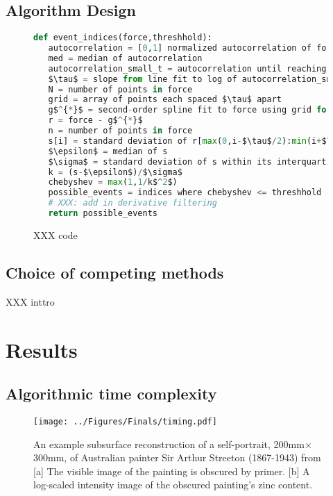 \documentclass[%
  aip,12pt,tightenlines,
  amsthm,
 amsmath,amssymb
]{article}
\newcommand{\fLabel}[1]{\label{figure:#1}}
\newcommand{\sLabel}[1]{\label{section:#1}}
\newcommand{\pcaption}[1]{\caption{\noindent#1}}
\newcommand{\pEndF}[0]{ \\ }
\newcommand{\pStartF}[0]{ }
\begin{document}
\subsection{\sLabel{Algorithm}Algorithm Design}


\begin{figure}
  \begin{lstlisting}[language=Python]
def event_indices(force,threshhold):
   autocorrelation = [0,1] normalized autocorrelation of force
   med = median of autocorrelation
   autocorrelation_small_t = autocorrelation until reaching med
   $\tau$ = slope from line fit to log of autocorrelation_small_t
   N = number of points in force
   grid = array of points each spaced $\tau$ apart
   g$^{*}$ = second-order spline fit to force using grid for knots
   r = force - g$^{*}$
   n = number of points in force
   s[i] = standard deviation of r[max(0,i-$\tau$/2):min(i+$\tau$/2,n)]
   $\epsilon$ = median of s
   $\sigma$ = standard deviation of s within its interquartile region
   k = (s-$\epsilon$)/$\sigma$
   chebyshev = max(1,1/k$^2$)
   possible_events = indices where chebyshev <= threshhold
   # XXX: add in derivative filtering
   return possible_events
\end{lstlisting}
\pcaption{\noindent\fLabel{Code}\pStartF XXX code  \pEndF }
\end{figure}

\subsection{\sLabel{Compare}Choice of competing methods}

XXX inttro

\section{\sLabel{Results}Results}

\subsection{\sLabel{Timing}Algorithmic time complexity}



\begin{figure}
\centering
\texttt{[image: ../Figures/Finals/timing.pdf]}%
\pcaption{\noindent\fLabel{Cartoon}\pStartF An example subsurface reconstruction of a self-portrait, 200mm$\times$300mm, of Australian painter Sir Arthur Streeton (1867-1943) from \citet{howard_high-definition_2012} [a] The visible image of the painting is obscured by primer. [b] A log-scaled intensity image of the obscured painting's zinc content. \pEndF }
\end{figure}
\end{document}
